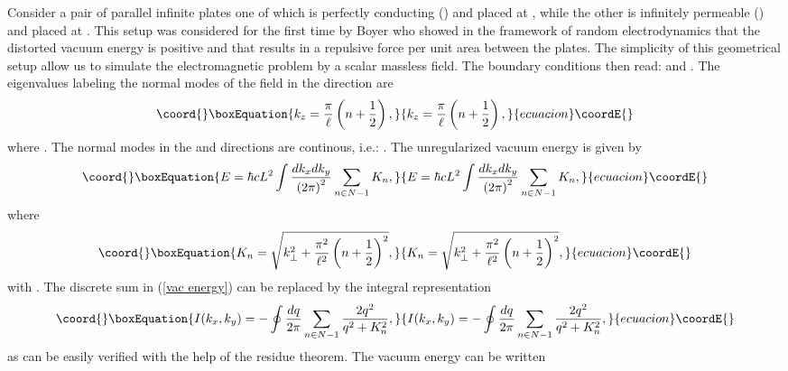 \documentclass[a4paper,12pt]{article}
\begin{document}
Consider a pair of parallel infinite plates one of which is perfectly conducting (\myHighlight{$\epsilon\to\infty$}\coordHE{}) and placed at \coordHE{}, while the other is infinitely permeable (\myHighlight{$\mu\to\infty$}\coordHE{}) and placed at \coordHE{}. This setup was considered for the first time by Boyer \cite{Boyer1974} who showed in the framework of random electrodynamics that the distorted vacuum energy is positive and that results in a repulsive force per unit area between the plates. The simplicity of this geometrical setup allow us to simulate the electromagnetic problem by a scalar massless field. The boundary conditions then read: \coordHE{} and \coordHE{}. The eigenvalues labeling the normal modes of the field in the \coordHE{} direction are
%
\begin{equation}\coord{}\boxEquation{
k_z=\frac{\pi}{\ell}\left(n+\frac{1}{2}\right), 
}{
k_z=\frac{\pi}{\ell}\left(n+\frac{1}{2}\right), 
}{ecuacion}\coordE{}\end{equation}
%
where \coordHE{}. The normal modes  in the \coordHE{} and \coordHE{} directions are continous, i.e.: \coordHE{}. The unregularized vacuum energy is given by
%
\begin{equation}\coord{}\boxEquation{\label{vac energy}
E=\hbar c L^2\int \frac{dk_xdk_y}{\left(2\pi\right)^2}\sum_{n\in N-1}K_n,
}{E=\hbar c L^2\int \frac{dk_xdk_y}{\left(2\pi\right)^2}\sum_{n\in N-1}K_n,
}{ecuacion}\coordE{}\end{equation}
%
where
\begin{equation}\coord{}\boxEquation{
K_n=\sqrt{k_\bot^2+\frac{\pi^2}{\ell^2}\left(n+\frac{1}{2}\right)^2},
}{
K_n=\sqrt{k_\bot^2+\frac{\pi^2}{\ell^2}\left(n+\frac{1}{2}\right)^2},
}{ecuacion}\coordE{}\end{equation}
%
with \coordHE{}. The discrete sum in (\ref{vac energy}) can be replaced by the integral representation
%
\begin{equation}\coord{}\boxEquation{
I(k_x,k_y)=-\oint\frac{dq}{2\pi}\sum_{n\in N-1}\frac{2q^2}{q^2+K_n^2},
}{
I(k_x,k_y)=-\oint\frac{dq}{2\pi}\sum_{n\in N-1}\frac{2q^2}{q^2+K_n^2},
}{ecuacion}\coordE{}\end{equation}
%
as can be easily verified with the help of the residue theorem. The vacuum energy can be written
\end{document}
